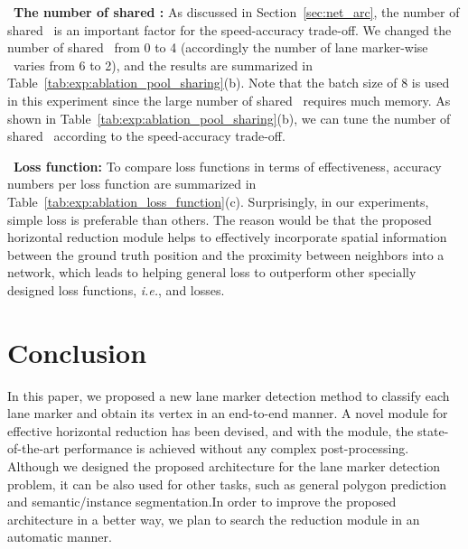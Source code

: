 \documentclass[10pt,twocolumn,letterpaper]{article}
\begin{document}
\ \textbf{The number of shared \reductionname:} As discussed in Section~\ref{sec:net_arc}, the number of shared \reductionnames\ is an important factor for the speed-accuracy trade-off. We changed the number of shared \reductionnames\ from 0 to 4 (accordingly the number of lane marker-wise \reductionnames\ varies from 6 to 2), and the results are summarized in Table~\ref{tab:exp:ablation_pool_sharing}(b). Note that the batch size of 8 is used in this experiment since the large number of shared \reductionnames\ requires much memory. As shown in Table~\ref{tab:exp:ablation_pool_sharing}(b), we can tune the number of shared \reductionname\ according to the speed-accuracy trade-off.

\ \textbf{Loss function:} To compare loss functions in terms of effectiveness, accuracy numbers per loss function are summarized in Table~\ref{tab:exp:ablation_loss_function}(c). Surprisingly, in our experiments, simple  loss is preferable than others. The reason would be that the proposed horizontal reduction module helps to effectively incorporate spatial information between the ground truth position and the proximity between neighbors into a network, which leads to helping general  loss to outperform other specially designed loss functions, \textit{i.e.},  and  losses.

\section{Conclusion} 
In this paper, we proposed a new lane marker detection method to classify each lane marker and obtain its vertex in an end-to-end manner. A novel module for effective horizontal reduction has been devised, and with the module, the state-of-the-art performance is achieved without any complex post-processing. Although we designed the proposed architecture for the lane marker detection problem, it can be also used for other tasks, such as general polygon prediction and semantic/instance segmentation.In order to improve the proposed architecture in a better way, we plan to search the reduction module in an automatic manner.

{\small


}
\end{document}
